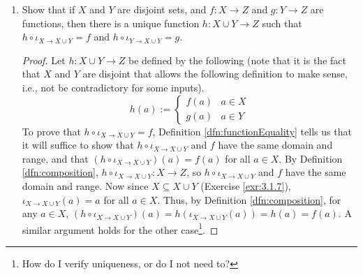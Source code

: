\documentclass[../main.tex]{subfiles}
\begin{document}
\begin{enumerate}[ref={\thesection.\arabic*}]
\begin{enumerate}
\begin{proof}
        \end{proof}
        \item Show that if $X$ and $Y$ are disjoint sets, and $f:X\to Z$ and $g:Y\to Z$ are functions, then there is a unique function $h:X\cup Y\to Z$ such that $h\circ\iota_{X\to X\cup Y}=f$ and $h\circ\iota_{Y\to X\cup Y}=g$.
        \begin{proof}
            Let $h:X\cup Y\to Z$ be defined by the following (note that it is the fact that $X$ and $Y$ are disjoint that allows the following definition to make sense, i.e., not be contradictory for some inputs).
            \begin{equation*}
                h(a) :=
                \begin{cases}
                    f(a) & a\in X\\
                    g(a) & a\in Y
                \end{cases}
            \end{equation*}
            To prove that $h\circ\iota_{X\to X\cup Y}=f$, Definition \ref{dfn:functionEquality} tells us that it will suffice to show that $h\circ\iota_{X\to X\cup Y}$ and $f$ have the same domain and range, and that $(h\circ\iota_{X\to X\cup Y})(a)=f(a)$ for all $a\in X$. By Definition \ref{dfn:composition}, $h\circ\iota_{X\to X\cup Y}:X\to Z$, so $h\circ\iota_{X\to X\cup Y}$ and $f$ have the same domain and range. Now since $X\subseteq X\cup Y$ (Exercise \ref{exr:3.1.7}), $\iota_{X\to X\cup Y}(a)=a$ for all $a\in X$. Thus, by Definition \ref{dfn:composition}, for any $a\in X$, $(h\circ\iota_{X\to X\cup Y})(a)=h(\iota_{X\to X\cup Y}(a))=h(a)=f(a)$. A similar argument holds for the other case\footnote{How do I verify uniqueness, or do I not need to?}.
        \end{proof}
    \end{enumerate}
\end{enumerate}
\end{document}
